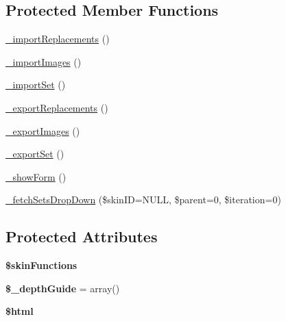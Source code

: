 \subsection*{Protected Member Functions}
\begin{DoxyCompactItemize}
\item 
\hyperlink{classadmin__core__templates__importexport_a0cc7bf3c965ef5e17527cd455c42ddea}{\-\_\-import\-Replacements} ()
\item 
\hyperlink{classadmin__core__templates__importexport_a5f2a923c1e46adceee34db13d1f9ac19}{\-\_\-import\-Images} ()
\item 
\hyperlink{classadmin__core__templates__importexport_a7e4110c44925ec4da3b96e2cbd5cbae7}{\-\_\-import\-Set} ()
\item 
\hyperlink{classadmin__core__templates__importexport_a2cb3414bf59dc280dd115b1644d5b6ba}{\-\_\-export\-Replacements} ()
\item 
\hyperlink{classadmin__core__templates__importexport_ac9e941c5e31892524ef0217ef3f1edcf}{\-\_\-export\-Images} ()
\item 
\hyperlink{classadmin__core__templates__importexport_a8b95ad1849d75531be9dcc5e26ff350d}{\-\_\-export\-Set} ()
\item 
\hyperlink{classadmin__core__templates__importexport_a5741a03d8eba52b11a74e90df95f1ab8}{\-\_\-show\-Form} ()
\item 
\hyperlink{classadmin__core__templates__importexport_a73b8d11230530261b8c2a67302daf164}{\-\_\-fetch\-Sets\-Drop\-Down} (\$skin\-I\-D=N\-U\-L\-L, \$parent=0, \$iteration=0)
\end{DoxyCompactItemize}
\subsection*{Protected Attributes}
\begin{DoxyCompactItemize}
\item 
\hypertarget{classadmin__core__templates__importexport_a41d90687021c6f16184b43666509dee8}{{\bfseries \$skin\-Functions}}\label{classadmin__core__templates__importexport_a41d90687021c6f16184b43666509dee8}

\item 
\hypertarget{classadmin__core__templates__importexport_a34861d67570799fc8f5d4e2ebefcfc7b}{{\bfseries \$\-\_\-depth\-Guide} = array()}\label{classadmin__core__templates__importexport_a34861d67570799fc8f5d4e2ebefcfc7b}

\item 
\hypertarget{classadmin__core__templates__importexport_a6f96e7fc92441776c9d1cd3386663b40}{{\bfseries \$html}}\label{classadmin__core__templates__importexport_a6f96e7fc92441776c9d1cd3386663b40}

\end{DoxyCompactItemize}


